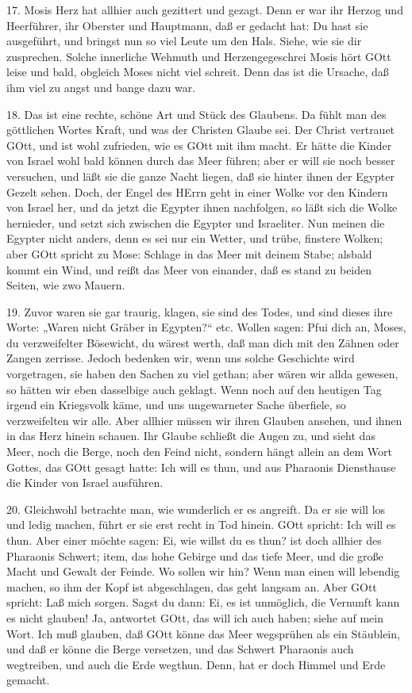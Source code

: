 17. Mosis Herz hat allhier auch gezittert und gezagt. Denn er war ihr Herzog und Heerführer, ihr Oberster und Hauptmann, daß er gedacht hat: Du hast sie ausgeführt, und bringst nun so viel Leute um den Hals. Siehe, wie sie dir zusprechen. Solche innerliche Wehmuth und Herzengegeschrei Mosis hört GOtt leise und bald, obgleich Moses nicht viel schreit. Denn das ist die Ursache, daß ihm viel zu angst und bange dazu war.

18. Das ist eine rechte, schöne Art und Stück des Glaubens. Da fühlt man des göttlichen Wortes Kraft, und was der Christen Glaube sei. Der Christ vertrauet GOtt, und ist wohl zufrieden, wie es GOtt mit ihm macht. Er hätte die Kinder von Israel wohl bald können durch das Meer führen; aber er will sie noch besser versuchen, und läßt sie die ganze Nacht liegen, daß sie hinter ihnen der Egypter Gezelt sehen. Doch, der Engel des HErrn geht in einer Wolke vor den Kindern von Israel her, und da jetzt die Egypter ihnen nachfolgen, so läßt sich die Wolke hernieder, und setzt sich zwischen die Egypter und Israeliter. Nun meinen die Egypter nicht anders, denn es sei nur ein Wetter, und trübe, finstere Wolken; aber GOtt spricht zu Mose: Schlage in das Meer mit deinem Stabe; alsbald kommt ein Wind, und reißt das Meer von einander, daß es stand zu beiden Seiten, wie zwo Mauern.

19. Zuvor waren sie gar traurig, klagen, sie sind des Todes, und sind dieses ihre Worte: „Waren nicht Gräber in Egypten?“ etc. Wollen sagen: Pfui dich an, Moses, du verzweifelter Bösewicht, du wärest werth, daß man dich mit den Zähnen oder Zangen zerrisse. Jedoch bedenken wir, wenn uns solche Geschichte wird vorgetragen, sie haben den Sachen zu viel gethan; aber wären wir allda gewesen, so hätten wir eben dasselbige auch geklagt. Wenn noch auf den heutigen Tag irgend ein Kriegsvolk käme, und uns ungewarneter Sache überfiele, so verzweifelten wir alle. Aber allhier müssen wir ihren Glauben ansehen, und ihnen in das Herz hinein schauen. Ihr Glaube schließt die Augen zu, und sieht das Meer, noch die Berge, noch den Feind nicht, sondern hängt allein an dem Wort Gottes, das GOtt gesagt hatte: Ich will es thun, und aus Pharaonis Diensthause die Kinder von Israel ausführen.

20. Gleichwohl betrachte man, wie wunderlich er es angreift. Da er sie will los und ledig machen, führt er sie erst recht in Tod hinein. GOtt spricht: Ich will es thun. Aber einer möchte sagen: Ei, wie willst du es thun? ist doch allhier des Pharaonis Schwert; item, das hohe Gebirge und das tiefe Meer, und die große Macht und Gewalt der Feinde. Wo sollen wir hin? Wenn man einen will lebendig machen, so ihm der Kopf ist abgeschlagen, das geht langsam an. Aber GOtt spricht: Laß mich sorgen. Sagst du dann: Ei, es ist unmöglich, die Vernunft kann es nicht glauben! Ja, antwortet GOtt, das will ich auch haben; siehe auf mein Wort. Ich muß glauben, daß GOtt könne das Meer wegsprühen als ein Stäublein, und daß er könne die Berge versetzen, und das Schwert Pharaonis auch wegtreiben, und auch die Erde wegthun. Denn, hat er doch Himmel und Erde gemacht.

